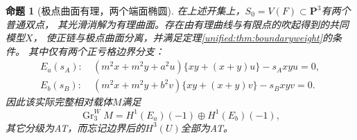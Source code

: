 \documentclass[11pt,a4paper,oneside]{ctexart}
\theoremstyle{cnplain}
\newtheorem{proposition}[theorem]{命题}
\theoremstyle{definition}
\theoremstyle{remark}
\numberwithin{equation}{section}
\begin{document}
\begin{proposition}[极点曲面有理，两个端面椭圆]\label{unified:prop:injectedgeometry}
在上述开集上，$S_0=V(F)\subset\mathbf P^3$有两个普通双点，
其光滑消解为有理曲面。存在由有理曲线与有限点的吹起得到的共同模型$X$，
使正链与极点曲面分离，并满足定理\ref{unified:thm:boundaryweight}的条件。
其中仅有两个正亏格边界分支：
\begin{align}
 E_a(s_A):\ &(m^2x+m^2y+a^2u)\{xy+(x+y)u\}-s_Axyu=0,\\
 E_b(s_B):\ &(m^2x+m^2y+b^2v)\{xy+(x+y)v\}-s_Bxyv=0.
 \label{unified:eq:twofaceelliptics}
\end{align}
因此该实际完整相对载体$M$满足
\begin{equation}\label{unified:eq:injectedcarrier}
 \operatorname{Gr}^W_3 M=H^1(E_a)(-1)\oplus H^1(E_b)(-1),
\end{equation}
其它分级为AT，而忘记边界后的$H^3(U)$全部为AT。
\end{proposition}
\end{document}
